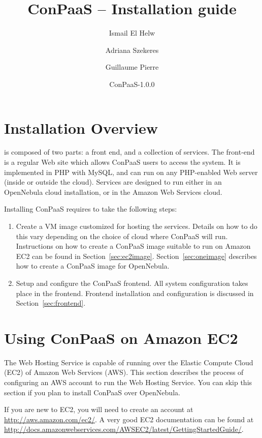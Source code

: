 \documentclass[10pt]{article}
\title{ConPaaS -- Installation guide\htmlonly{ [\xml{a href="installation.pdf"}pdf\xml{/a}]}}
\author{Ismail El Helw \and Adriana Szekeres \and Guillaume Pierre}
\date{ConPaaS-1.0.0}
\begin{document}
\maketitle

\T\vfil
\T\tableofcontents
\T\vfil
\T\newpage

\section{Installation Overview}
\label{sec:overview}

 is composed of two parts: a
front end, and a collection of services. The front-end is a regular
Web site which allows ConPaaS users to access the system. It is
implemented in PHP with MySQL, and can run on any PHP-enabled Web
server (inside or outside the cloud).  Services are designed to run
either in an OpenNebula cloud installation, or in the Amazon Web
Services cloud.

Installing ConPaaS requires to take the following steps:

\begin{enumerate}
\item Create a VM image customized for hosting the services. Details
  on how to do this vary depending on the choice of cloud where
  ConPaaS will run. Instructions on how to create a ConPaaS image suitable
to run on Amazon EC2 can be found in Section~\ref{sec:ec2image}. 
  Section~\ref{sec:oneimage} describes how to create a ConPaaS image for OpenNebula.
\item Setup and configure the ConPaaS frontend. All system
  configuration takes place in the frontend. Frontend installation and
  configuration is discussed in Section~\ref{sec:frontend}.
\end{enumerate}

\section{Using ConPaaS on Amazon EC2}

The Web Hosting Service is capable of running over the Elastic Compute
Cloud (EC2) of Amazon Web Services (AWS). This section describes the
process of configuring an AWS account to run the Web Hosting Service.
You can skip this section if you plan to install ConPaaS over
OpenNebula.

If you are new to EC2, you will need to create an account at
\url{http://aws.amazon.com/ec2/}. A very good EC2 documentation can be
found at
\url{http://docs.amazonwebservices.com/AWSEC2/latest/GettingStartedGuide/}.
\end{document}
